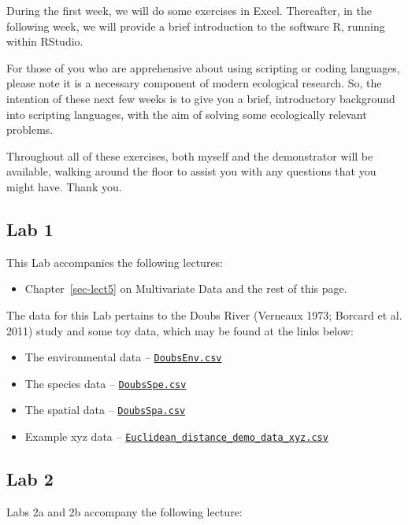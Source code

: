 \documentclass[
  10pt,
]{book}
\providecommand{\tightlist}{%
  \setlength{\itemsep}{0pt}\setlength{\parskip}{0pt}}
\let\oldtexttt\texttt
\renewcommand{\texttt}[1]{\oldtexttt{\small #1}}
\begin{document}
During the first week, we will do some exercises in Excel. Thereafter,
in the following week, we will provide a brief introduction to the
software R, running within RStudio.

For those of you who are apprehensive about using scripting or coding
languages, please note it is a necessary component of modern ecological
research. So, the intention of these next few weeks is to give you a
brief, introductory background into scripting languages, with the aim of
solving some ecologically relevant problems.

Throughout all of these exercises, both myself and the demonstrator will
be available, walking around the floor to assist you with any questions
that you might have. Thank you.

\subsection{Lab 1}\label{lab-1}

This Lab accompanies the following lectures:

\begin{itemize}
\tightlist
\item
  Chapter~\ref{sec-lect5} on Multivariate Data and the rest of this
  page.
\end{itemize}

The data for this Lab pertains to the Doubs River (Verneaux 1973;
Borcard et al. 2011) study and some toy data, which may be found at the
links below:

\begin{itemize}
\tightlist
\item
  The environmental data --
  \href{../data/DoubsEnv.csv}{\texttt{DoubsEnv.csv}}
\item
  The species data -- \href{../data/DoubsSpe.csv}{\texttt{DoubsSpe.csv}}
\item
  The spatial data -- \href{../data/DoubsSpa.csv}{\texttt{DoubsSpa.csv}}
\item
  Example xyz data --
  \href{../data/Euclidean_distance_demo_data_xyz.csv}{\texttt{Euclidean\_distance\_demo\_data\_xyz.csv}}
\end{itemize}

\subsection{Lab 2}\label{lab-2}

Labs 2a and 2b accompany the following lecture:
\end{document}
